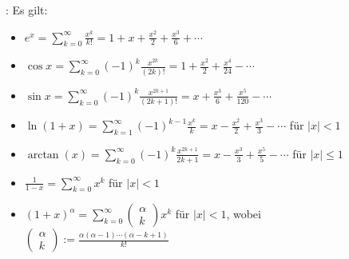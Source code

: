 \Satz {}: Es gilt:
\vspace{-0.6em}
\begin{itemize}
    \item $e^x = \sum_{k=0}^\infty \frac{x^{k}}{k!} = 1 + x + \frac{x^2}{2} + \frac{x^3}{6} + \cdots$
    \item $\cos x = \sum_{k=0}^\infty (-1)^k \frac{x^{2k}}{(2k)!} = 1 + \frac{x^2}{2} + \frac{x^4}{24} - \cdots$
    \item $\sin x = \sum_{k=0}^\infty (-1)^k \frac{x^{2k + 1}}{(2k+1)!} = x + \frac{x^3}{6} + \frac{x^5}{120} - \cdots$
    \item $\ln (1 + x) = \sum_{k=1}^\infty (-1)^{k-1} \frac{x^k}{k} = x - \frac{x^2}{2} + \frac{x^3}{3} - \cdots$ für $|x| < 1$
    \item $\arctan(x) = \sum_{k=0}^\infty (-1)^k \frac{x^{2k+1}}{2k+1} = x - \frac{x^3}{3} + \frac{x^5}{5} - \cdots$ für $|x| \le 1$
    \item $\frac{1}{1-x} = \sum_{k=0}^\infty x^k$ für $|x| < 1$
    \item $(1 + x)^\alpha = \sum_{k=0}^\infty \begin{pmatrix}\alpha \\ k\end{pmatrix} x^k$ für $|x| < 1$, wobei $\begin{pmatrix}\alpha \\ k\end{pmatrix} := \frac{\alpha(\alpha-1)\cdots(\alpha-k+1)}{k!}$
\end{itemize}
